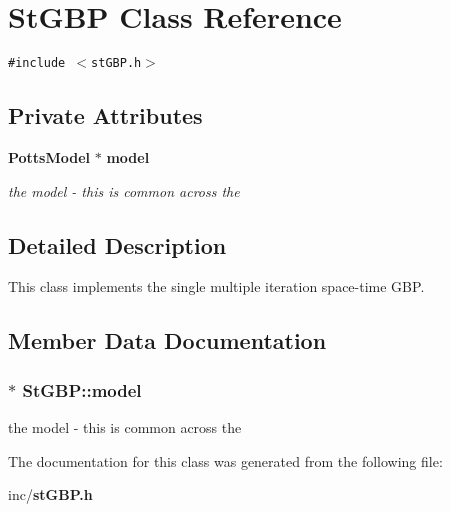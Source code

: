 \section{StGBP Class Reference}
\label{classStGBP}
{\tt \#include $<$stGBP.h$>$}

\subsection*{Private Attributes}
\begin{CompactItemize}
\item 
{\bf PottsModel} $\ast$ {\bf model}
\begin{CompactList}\small\item\em the model - this is common across the \item\end{CompactList}\end{CompactItemize}


\subsection{Detailed Description}
This class implements the single multiple iteration space-time GBP. 



\subsection{Member Data Documentation}
\subsubsection{$\ast$ {\bf StGBP::model}\hspace{0.3cm}{\tt  [private]}}\label{classStGBP_918b5cba3de8b98d0fcafc8a357bd922}


the model - this is common across the 



The documentation for this class was generated from the following file:\begin{CompactItemize}
\item 
inc/{\bf stGBP.h}\end{CompactItemize}
